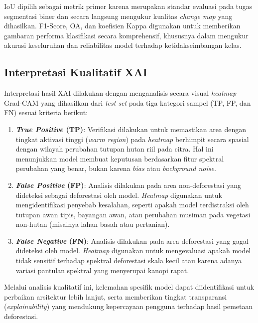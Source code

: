 IoU dipilih sebagai metrik primer karena merupakan standar evaluasi pada tugas segmentasi biner dan secara langsung mengukur kualitas \textit{change map} yang dihasilkan. F1-Score, OA, dan koefisien Kappa digunakan untuk memberikan gambaran performa klasifikasi secara komprehensif, khususnya dalam mengukur akurasi keseluruhan dan reliabilitas model terhadap ketidakseimbangan kelas.

\subsection{Interpretasi Kualitatif XAI}

Interpretasi hasil XAI dilakukan dengan menganalisis secara visual \textit{heatmap} Grad-CAM yang dihasilkan dari \textit{test set} pada tiga kategori sampel (TP, FP, dan FN) sesuai kriteria berikut:
\begin{enumerate}
  \item \textbf{\textit{True Positive} (TP)}: Verifikasi dilakukan untuk memastikan area dengan tingkat aktivasi tinggi (\textit{warm region}) pada \textit{heatmap} berhimpit secara spasial dengan wilayah perubahan tutupan hutan riil pada citra. Hal ini menunjukkan model membuat keputusan berdasarkan fitur spektral perubahan yang benar, bukan karena \textit{bias} atau \textit{background noise}.
  \item \textbf{\textit{False Positive} (FP)}: Analisis dilakukan pada area non-deforestasi yang dideteksi sebagai deforestasi oleh model. \textit{Heatmap} digunakan untuk mengidentifikasi penyebab kesalahan, seperti apakah model terdistraksi oleh tutupan awan tipis, bayangan awan, atau perubahan musiman pada vegetasi non-hutan (misalnya lahan basah atau pertanian).
  \item \textbf{\textit{False Negative} (FN)}: Analisis dilakukan pada area deforestasi yang gagal dideteksi oleh model. \textit{Heatmap} digunakan untuk mengevaluasi apakah model tidak sensitif terhadap spektral deforestasi skala kecil atau karena adanya variasi pantulan spektral yang menyerupai kanopi rapat.
\end{enumerate}
Melalui analisis kualitatif ini, kelemahan spesifik model dapat diidentifikasi untuk perbaikan arsitektur lebih lanjut, serta memberikan tingkat transparansi (\textit{explainability}) yang mendukung kepercayaan pengguna terhadap hasil pemetaan deforestasi.



